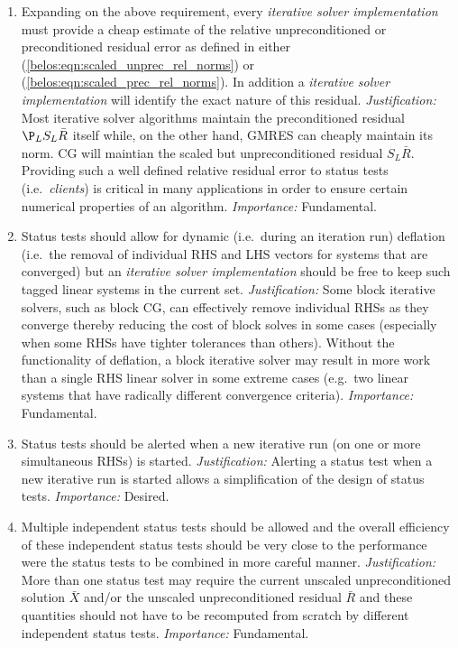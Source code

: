 \documentclass[pdf,ps2pdf,11pt]{SANDreport}
\begin{document}
\begin{enumerate}
\item
Expanding on the above requirement, every {}\textit{iterative solver
implementation} must provide a cheap estimate of the relative
unpreconditioned or preconditioned residual error as defined in either
(\ref{belos:eqn:scaled_unprec_rel_norms}) or
(\ref{belos:eqn:scaled_prec_rel_norms}).  In addition a
{}\textit{iterative solver implementation} will identify the exact
nature of this residual.  {}\textit{Justification:} Most iterative
solver algorithms maintain the preconditioned residual $\P_L S_L
{}\bar{R}$ itself while, on the other hand, GMRES can cheaply maintain
its norm.  CG will maintian the scaled but unpreconditioned residual
$S_L {}\bar{R}$.  Providing such a well defined relative residual
error to status tests (i.e.~{}\textit{clients}) is critical in many
applications in order to ensure certain numerical properties of an
algorithm.  {}\textit{Importance:} Fundamental.

\item
Status tests should allow for dynamic (i.e.~during an iteration run)
deflation (i.e.~the removal of individual RHS and LHS vectors for
systems that are converged) but an {}\textit{iterative solver
implementation} should be free to keep such tagged linear systems in
the current set.  {}\textit{Justification:} Some block iterative
solvers, such as block CG, can effectively remove individual RHSs as
they converge thereby reducing the cost of block solves in some cases
(especially when some RHSs have tighter tolerances than others).
Without the functionality of deflation, a block iterative solver may
result in more work than a single RHS linear solver in some extreme
cases (e.g.~two linear systems that have radically different
convergence criteria).  {}\textit{Importance:} Fundamental.

\item
Status tests should be alerted when a new iterative run (on one or
more simultaneous RHSs) is started.  {}\textit{Justification:}
Alerting a status test when a new iterative run is started allows a
simplification of the design of status tests.  {}\textit{Importance:}
Desired.

\item
Multiple independent status tests should be allowed and the overall
efficiency of these independent status tests should be very close to
the performance were the status tests to be combined in more careful
manner.  {}\textit{Justification:} More than one status test may
require the current unscaled unpreconditioned solution $\bar{X}$
and/or the unscaled unpreconditioned residual $\bar{R}$ and these
quantities should not have to be recomputed from scratch by different
independent status tests.  {}\textit{Importance:} Fundamental.


\end{enumerate}
\end{document}
